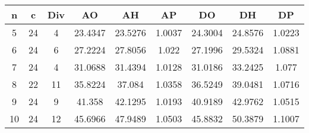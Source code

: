 \begin{tabular}{ | c || c | c || c | c | c || c | c | c | }
\hline
{\bf n} & {\bf c} & {\bf Div} & {\bf AO} & {\bf AH} & {\bf AP} & {\bf DO} & {\bf DH} & {\bf DP} \\ \hline
5 & 24 & 4 & 23.4347 & 23.5276 & 1.0037 & 24.3004 & 24.8576 & 1.0223 \\ \hline
6 & 24 & 6 & 27.2224 & 27.8056 & 1.022 & 27.1996 & 29.5324 & 1.0881 \\ \hline
7 & 24 & 4 & 31.0688 & 31.4394 & 1.0128 & 31.0186 & 33.2425 & 1.077 \\ \hline
8 & 22 & 11 & 35.8224 & 37.084 & 1.0358 & 36.5249 & 39.0481 & 1.0716 \\ \hline
9 & 24 & 9 & 41.358 & 42.1295 & 1.0193 & 40.9189 & 42.9762 & 1.0515 \\ \hline
10 & 24 & 12 & 45.6966 & 47.9489 & 1.0503 & 45.8832 & 50.3879 & 1.1007 \\ \hline
\end{tabular}